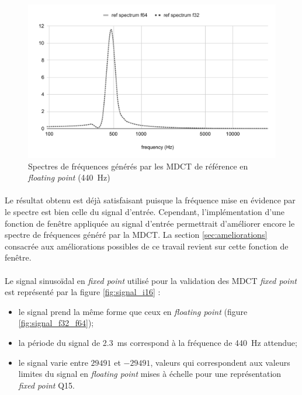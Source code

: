 \documentclass{article}
\begin{document}
    \begin{figure}[H]
        \centering
        \includegraphics[width=.8\linewidth]{./images/validation_ref_float.pdf}
        \caption{Spectres de fréquences générés par les MDCT de référence en \emph{floating point} (\SI{440}{\hertz})}
        \label{fig:validation_ref_mdct_float}
    \end{figure}

    \paragraph{}
    Le résultat obtenu est déjà satisfaisant puisque la fréquence mise en évidence par le spectre est bien celle du signal d'entrée. Cependant, l'implémentation d'une fonction de fenêtre appliquée au signal d'entrée permettrait d'améliorer encore le spectre de fréquences généré par la MDCT. La section \ref{sec:ameliorations} consacrée aux améliorations possibles de ce travail revient sur cette fonction de fenêtre.

    \paragraph{}
    Le signal sinusoïdal en \emph{fixed point} utilisé pour la validation des MDCT \emph{fixed point} est représenté par la figure \ref{fig:signal_i16} :
    \begin{itemize}
        \item le signal prend la même forme que ceux en \emph{floating point} (figure \ref{fig:signal_f32_f64});
        \item la période du signal de \SI{2.3}{\milli\second} correspond à la fréquence de \SI{440}{\hertz} attendue;
        \item le signal varie entre $29491$ et $-29491$, valeurs qui correspondent aux valeurs limites du signal en \emph{floating point} mises à échelle pour une représentation \emph{fixed point} Q15.
    \end{itemize}
\end{document}
